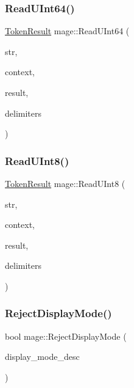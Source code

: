 \hypertarget{namespacemage_a87be513083fe421ab93f3007538ebef6}{}\label{namespacemage_a87be513083fe421ab93f3007538ebef6} 
\subsubsection{\texorpdfstring{Read\+U\+Int64()}{ReadUInt64()}}
{\footnotesize\ttfamily \hyperlink{namespacemage_a2178ba2411db5912f41b2e7698c2037d}{Token\+Result} mage\+::\+Read\+U\+Int64 (\begin{DoxyParamCaption}\item[{char $\ast$}]{str,  }\item[{char $\ast$$\ast$}]{context,  }\item[{uint64\+\_\+t \&}]{result,  }\item[{const char $\ast$}]{delimiters }\end{DoxyParamCaption})}

\hypertarget{namespacemage_a357352c06cab6568efee62ddc9dcc6c9}{}\label{namespacemage_a357352c06cab6568efee62ddc9dcc6c9} 
\subsubsection{\texorpdfstring{Read\+U\+Int8()}{ReadUInt8()}}
{\footnotesize\ttfamily \hyperlink{namespacemage_a2178ba2411db5912f41b2e7698c2037d}{Token\+Result} mage\+::\+Read\+U\+Int8 (\begin{DoxyParamCaption}\item[{char $\ast$}]{str,  }\item[{char $\ast$$\ast$}]{context,  }\item[{uint8\+\_\+t \&}]{result,  }\item[{const char $\ast$}]{delimiters }\end{DoxyParamCaption})}

\hypertarget{namespacemage_abdccde1f16aa2239019e1b455d8b941b}{}\label{namespacemage_abdccde1f16aa2239019e1b455d8b941b} 
\subsubsection{\texorpdfstring{Reject\+Display\+Mode()}{RejectDisplayMode()}}
{\footnotesize\ttfamily bool mage\+::\+Reject\+Display\+Mode (\begin{DoxyParamCaption}\item[{const D\+X\+G\+I\+\_\+\+M\+O\+D\+E\+\_\+\+D\+E\+S\+C1 $\ast$}]{display\+\_\+mode\+\_\+desc }\end{DoxyParamCaption})}


